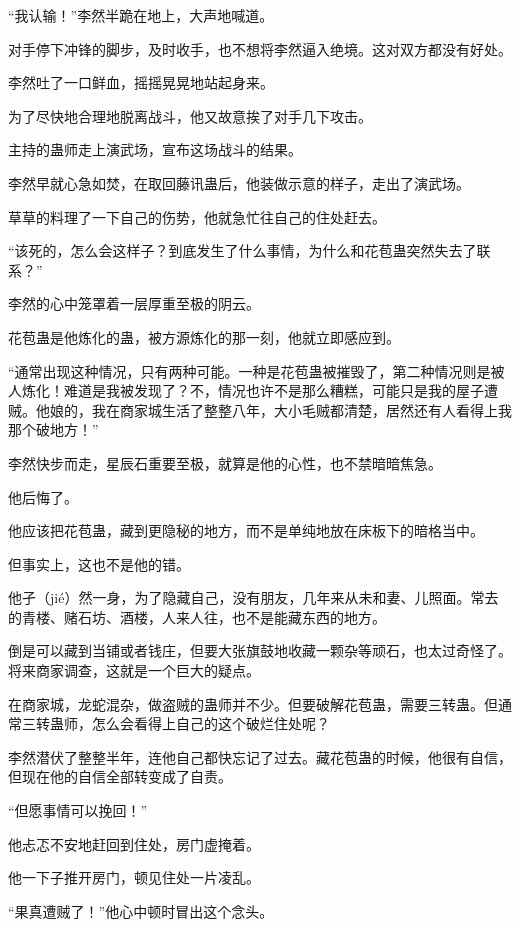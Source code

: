 
\begin{this_body}

“我认输！”李然半跪在地上，大声地喊道。

对手停下冲锋的脚步，及时收手，也不想将李然逼入绝境。这对双方都没有好处。

李然吐了一口鲜血，摇摇晃晃地站起身来。

为了尽快地合理地脱离战斗，他又故意挨了对手几下攻击。

主持的蛊师走上演武场，宣布这场战斗的结果。

李然早就心急如焚，在取回藤讯蛊后，他装做示意的样子，走出了演武场。

草草的料理了一下自己的伤势，他就急忙往自己的住处赶去。

“该死的，怎么会这样子？到底发生了什么事情，为什么和花苞蛊突然失去了联系？”

李然的心中笼罩着一层厚重至极的阴云。

花苞蛊是他炼化的蛊，被方源炼化的那一刻，他就立即感应到。

“通常出现这种情况，只有两种可能。一种是花苞蛊被摧毁了，第二种情况则是被人炼化！难道是我被发现了？不，情况也许不是那么糟糕，可能只是我的屋子遭贼。他娘的，我在商家城生活了整整八年，大小毛贼都清楚，居然还有人看得上我那个破地方！”

李然快步而走，星辰石重要至极，就算是他的心性，也不禁暗暗焦急。

他后悔了。

他应该把花苞蛊，藏到更隐秘的地方，而不是单纯地放在床板下的暗格当中。

但事实上，这也不是他的错。

他孑（jié）然一身，为了隐藏自己，没有朋友，几年来从未和妻、儿照面。常去的青楼、赌石坊、酒楼，人来人往，也不是能藏东西的地方。

倒是可以藏到当铺或者钱庄，但要大张旗鼓地收藏一颗杂等顽石，也太过奇怪了。将来商家调查，这就是一个巨大的疑点。

在商家城，龙蛇混杂，做盗贼的蛊师并不少。但要破解花苞蛊，需要三转蛊。但通常三转蛊师，怎么会看得上自己的这个破烂住处呢？

李然潜伏了整整半年，连他自己都快忘记了过去。藏花苞蛊的时候，他很有自信，但现在他的自信全部转变成了自责。

“但愿事情可以挽回！”

他忐忑不安地赶回到住处，房门虚掩着。

他一下子推开房门，顿见住处一片凌乱。

“果真遭贼了！”他心中顿时冒出这个念头。


\end{this_body}
